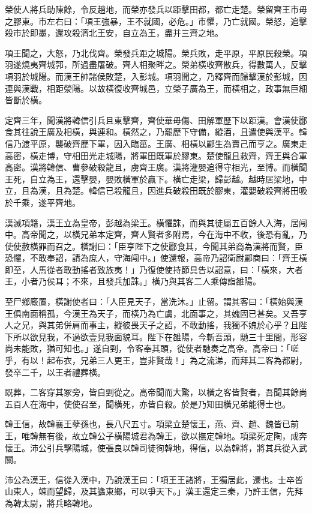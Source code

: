 \begin{pinyinscope}
榮使人將兵助陳餘，令反趙地，而榮亦發兵以距擊田都，都亡走楚。榮留齊王市毋之膠東。市左右曰：「項王強暴，王不就國，必危。」市懼，乃亡就國。榮怒，追擊殺市於即墨，還攻殺濟北王安，自立為王，盡并三齊之地。

項王聞之，大怒，乃北伐齊。榮發兵距之城陽。榮兵敗，走平原，平原民殺榮。項羽遂燒夷齊城郭，所過盡屠破。齊人相聚畔之。榮弟橫收齊散兵，得數萬人，反擊項羽於城陽。而漢王帥諸侯敗楚，入彭城。項羽聞之，乃釋齊而歸擊漢於彭城，因連與漢戰，相距滎陽。以故橫復收齊城邑，立榮子廣為王，而橫相之，政事無巨細皆斷於橫。

定齊三年，聞漢將韓信引兵且東擊齊，齊使華毋傷、田解軍歷下以距漢。會漢使酈食其往說王廣及相橫，與連和。橫然之，乃罷歷下守備，縱酒，且遣使與漢平。韓信乃渡平原，襲破齊歷下軍，因入臨菑。王廣、相橫以酈生為賣己而亨之。廣東走高密，橫走博，守相田光走城陽，將軍田既軍於膠東。楚使龍且救齊，齊王與合軍高密。漢將韓信、曹參破殺龍且，虜齊王廣。漢將灌嬰追得守相光，至博。而橫聞王死，自立為王，還擊嬰，嬰敗橫軍於贏下。橫亡走梁，歸彭越。越時居梁地，中立，且為漢，且為楚。韓信已殺龍且，因進兵破殺田既於膠東，灌嬰破殺齊將田吸於千乘，遂平齊地。

漢滅項籍，漢王立為皇帝，彭越為梁王。橫懼誅，而與其徒屬五百餘人入海，居闯中。高帝聞之，以橫兄弟本定齊，齊人賢者多附焉，今在海中不收，後恐有亂，乃使使赦橫罪而召之。橫謝曰：「臣亨陛下之使酈食其，今聞其弟商為漢將而賢，臣恐懼，不敢奉詔，請為庶人，守海闯中。」使還報，高帝乃詔衛尉酈商曰：「齊王橫即至，人馬從者敢動搖者致族夷！」乃復使使持節具告以詔意，曰：「橫來，大者王，小者乃侯耳；不來，且發兵加誅。」橫乃與其客二人乘傳詣雒陽。

至尸鄉廄置，橫謝使者曰：「人臣見天子，當洗沐。」止留。謂其客曰：「橫始與漢王俱南面稱孤，今漢王為天子，而橫乃為亡虜，北面事之，其媿固已甚矣。又吾亨人之兄，與其弟併肩而事主，縱彼畏天子之詔，不敢動搖，我獨不媿於心乎？且陛下所以欲見我，不過欲壹見我面貌耳。陛下在雒陽，今斬吾頭，馳三十里間，形容尚未能敗，猶可知也。」遂自剄，令客奉其頭，從使者馳奏之高帝。高帝曰：「嗟乎，有以！起布衣，兄弟三人更王，豈非賢哉！」為之流涕，而拜其二客為都尉，發卒二千，以王者禮葬橫。

既葬，二客穿其冢旁，皆自剄從之。高帝聞而大驚，以橫之客皆賢者，吾聞其餘尚五百人在海中，使使召至，聞橫死，亦皆自殺。於是乃知田橫兄弟能得士也。

韓王信，故韓襄王孽孫也，長八尺五寸。項梁立楚懷王，燕、齊、趙、魏皆已前王，唯韓無有後，故立韓公子橫陽城君為韓王，欲以撫定韓地。項梁死定陶，成奔懷王。沛公引兵擊陽城，使張良以韓司徒徇韓地，得信，以為韓將，將其兵從入武關。

沛公為漢王，信從入漢中，乃說漢王曰：「項王王諸將，王獨居此，遷也。士卒皆山東人，竦而望歸，及其蠭東鄉，可以爭天下。」漢王還定三秦，乃許王信，先拜為韓太尉，將兵略韓地。


\end{pinyinscope}
